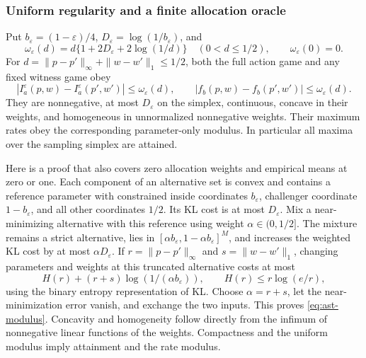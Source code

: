 \documentclass{article}
\theoremstyle{plain}
\theoremstyle{definition}
\begin{document}
\subsubsection{Uniform regularity and a finite allocation oracle}
\label{app:ast-regularity}
Put $b_\varepsilon=(1-\varepsilon)/4$,
$D_\varepsilon=\log(1/b_\varepsilon)$, and
\[
 \omega_\varepsilon(d)=d\{1+2D_\varepsilon+2\log(1/d)\}
 \quad(0<d\le1/2),\qquad \omega_\varepsilon(0)=0.
\]
For $d=\|p-p'\|_\infty+\|w-w'\|_1\le1/2$, both the full action game and
any fixed witness game obey
\begin{equation}
 |I_a^\varepsilon(p,w)-I_a^\varepsilon(p',w')|\le\omega_\varepsilon(d),
 \qquad |f_b(p,w)-f_b(p',w')|\le\omega_\varepsilon(d).
 \label{eq:ast-modulus}
\end{equation}
They are nonnegative, at most $D_\varepsilon$ on the simplex, continuous,
concave in their weights, and homogeneous in unnormalized nonnegative
weights.  Their maximum rates obey the corresponding parameter-only modulus.
In particular all maxima over the sampling simplex are attained.

Here is a proof that also covers zero allocation weights and empirical
means at zero or one.  Each component of an alternative set is convex and
contains a reference parameter with constrained inside coordinates
$b_\varepsilon$, challenger coordinate $1-b_\varepsilon$, and all other
coordinates $1/2$.  Its KL cost is at most $D_\varepsilon$.
Mix a near-minimizing alternative with this reference using weight
$\alpha\in(0,1/2]$.  The mixture remains a strict alternative, lies in
$[\alpha b_\varepsilon,1-\alpha b_\varepsilon]^M$, and increases the weighted
KL cost by at most $\alpha D_\varepsilon$.  If
$r=\|p-p'\|_\infty$ and $s=\|w-w'\|_1$, changing parameters and weights at
this truncated alternative costs at most
\[
 H(r)+(r+s)\log(1/(\alpha b_\varepsilon)),
 \qquad H(r)\le r\log(e/r),
\]
using the binary entropy representation of KL.  Choose $\alpha=r+s$, let
the near-minimization error vanish, and exchange the two inputs.  This proves
\eqref{eq:ast-modulus}.  Concavity and homogeneity follow directly from the
infimum of nonnegative linear functions of the weights.  Compactness and
the uniform modulus imply attainment and the rate modulus.
\end{document}
